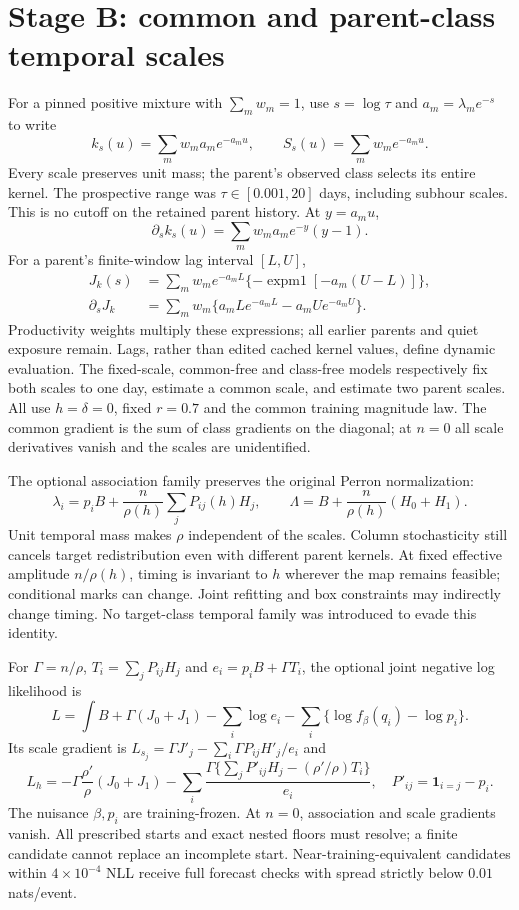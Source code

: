 \section{Stage B: common and parent-class temporal scales}
\label{sec:stage-b}
For a pinned positive mixture with $\sum_mw_m=1$, use $s=\log\tau$ and
$a_m=\lambda_m e^{-s}$ to write
\[
 k_s(u)=\sum_mw_ma_me^{-a_mu},\qquad S_s(u)=\sum_mw_me^{-a_mu}.
\]
Every scale preserves unit mass; the parent's observed class selects its
entire kernel. The prospective range was $\tau\in[0.001,20]$ days,
including subhour scales. This is no cutoff on the retained parent history.
At $y=a_mu$,
\[
 \partial_s k_s(u)=\sum_mw_ma_me^{-y}(y-1).
\]
For a parent's finite-window lag interval $[L,U]$,
\begin{align*}
 J_k(s)&=\sum_mw_me^{-a_mL}\{-\operatorname{expm1}[-a_m(U-L)]\},\\
 \partial_sJ_k&=\sum_mw_m\{a_mLe^{-a_mL}-a_mUe^{-a_mU}\}.
\end{align*}
Productivity weights multiply these expressions; all earlier parents and quiet
exposure remain. Lags, rather than edited cached kernel values, define dynamic
evaluation. The fixed-scale, common-free and class-free models respectively
fix both scales to one day, estimate a common scale, and estimate two parent
scales. All use $h=\delta=0$, fixed $r=0.7$ and the common training magnitude
law. The common gradient is the sum of class gradients on the diagonal;
at $n=0$ all scale derivatives vanish and the scales are unidentified.

The optional association family preserves the original Perron normalization:
\[
 \lambda_i=p_iB+\frac n{\rho(h)}\sum_jP_{ij}(h)H_j,\qquad
 \Lambda=B+\frac n{\rho(h)}(H_0+H_1).
\]
Unit temporal mass makes $\rho$ independent of the scales. Column stochasticity
still cancels target redistribution even with different parent kernels.
At fixed effective amplitude $n/\rho(h)$, timing is invariant to $h$ wherever
the map remains feasible; conditional marks can change. Joint refitting and
box constraints may indirectly change timing. No target-class temporal family
was introduced to evade this identity.

For $\Gamma=n/\rho$, $T_i=\sum_jP_{ij}H_j$ and
$e_i=p_iB+\Gamma T_i$, the optional joint negative log likelihood is
\[
 L=\int B+\Gamma(J_0+J_1)-\sum_i\log e_i
   -\sum_i\{\log f_\beta(q_i)-\log p_i\}.
\]
Its scale gradient is
$L_{s_j}=\Gamma J'_j-\sum_i\Gamma P_{ij}H'_j/e_i$ and
\[
 L_h=-\Gamma\frac{\rho'}\rho(J_0+J_1)
 -\sum_i\frac{\Gamma\{\sum_jP'_{ij}H_j-(\rho'/\rho)T_i\}}{e_i},
 \quad P'_{ij}=\mathbf1_{i=j}-p_i.
\]
The nuisance $\beta,p_i$ are training-frozen. At $n=0$, association and scale
gradients vanish. All prescribed starts and exact nested floors must resolve;
a finite candidate cannot replace an incomplete start. Near-training-equivalent
candidates within $4\times10^{-4}$ NLL receive full forecast checks with spread
strictly below $0.01$ nats/event.
